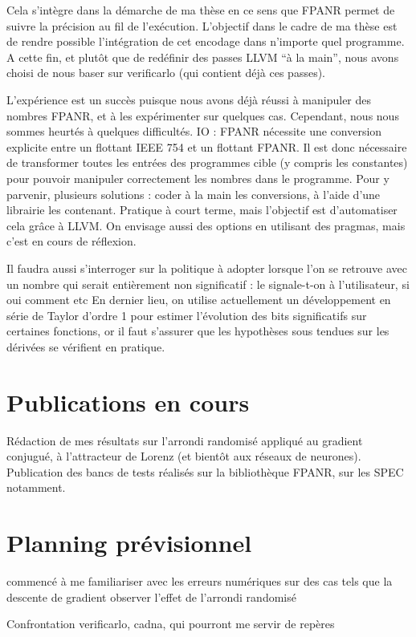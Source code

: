 \documentclass[a4paper,11pt]{article}
\begin{document}
Cela s’intègre dans la démarche de ma thèse en ce sens que FPANR permet de suivre la précision au fil de l’exécution.
L’objectif dans le cadre de ma thèse est de rendre possible l’intégration de cet encodage dans n’importe quel programme.
A cette fin, et plutôt que de redéfinir des passes LLVM “à la main”, nous avons choisi de nous baser sur verificarlo (qui contient déjà ces passes).

L’expérience est un succès puisque nous avons déjà réussi à manipuler des nombres FPANR, et à les expérimenter sur quelques cas.
Cependant, nous nous sommes heurtés à quelques difficultés.
IO : FPANR nécessite une conversion explicite entre un flottant IEEE 754 et un flottant FPANR. Il est donc nécessaire de transformer toutes les entrées des programmes cible (y compris les constantes) pour pouvoir manipuler correctement les nombres dans le programme. 
Pour y parvenir, plusieurs solutions : coder à la main les conversions, à l’aide d’une librairie les contenant. Pratique à court terme, mais l’objectif est d’automatiser cela grâce à LLVM.
On envisage aussi des options en utilisant des pragmas, mais c’est en cours de réflexion.

Il faudra aussi s’interroger sur la politique à adopter lorsque l’on se retrouve avec un nombre qui serait entièrement non significatif : le signale-t-on à l’utilisateur, si oui comment etc
En dernier lieu, on utilise actuellement un développement en série de Taylor d’ordre 1 pour estimer l’évolution des bits significatifs sur certaines fonctions, or il faut s’assurer que les hypothèses sous tendues sur les dérivées se vérifient en pratique.


\section{Publications en cours}
Rédaction de mes résultats sur l'arrondi randomisé appliqué au gradient conjugué, à l'attracteur de Lorenz (et bientôt aux réseaux de neurones).
Publication des bancs de tests réalisés sur la bibliothèque FPANR, sur les SPEC notamment. %

\section{Planning prévisionnel}

commencé à me familiariser avec les erreurs numériques sur des cas tels que la descente de gradient
observer l’effet de l’arrondi randomisé

Confrontation
verificarlo, cadna, qui pourront me servir de repères
\end{document}
